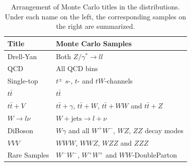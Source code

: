 \begin{table}[!htb]
  \centering
  \begin{tabular}{|l|l|}
\hline
Title & Monte Carlo Samples \\
\hline
Drell-Yan & Both $Z/\gamma^* \rightarrow ll$ \\
QCD & All QCD bins \\
Single-top & $t^\pm$ $s$-, $t$- and $tW$-channels \\
$t \bar{t}$ & $t \bar{t}$ \\
$t \bar{t} + V$ & $t \bar{t} + \gamma$, $t \bar{t} + W$, $t \bar{t} + WW$ and $t \bar{t} + Z$ \\
$W \rightarrow l \nu$ & $W + \text{jets} \rightarrow l + \nu$ \\
DiBoson & $W\gamma$ and all $W^+W^-$, $WZ$, $ZZ$ decay modes \\
$VVV$ & $WWW$, $WWZ$, $WZZ$ and $ZZZ$ \\
Rare Samples & $W^-W^-$, $W^+W^+$ and $WW$-DoubleParton \\
\hline
  \end{tabular}
  \caption{Arrangement of Monte Carlo titles in the distributions. Under each name on the left, the corresponding samples on the right are summarized.}
  \label{tab:mcpooltitles}
\end{table}

